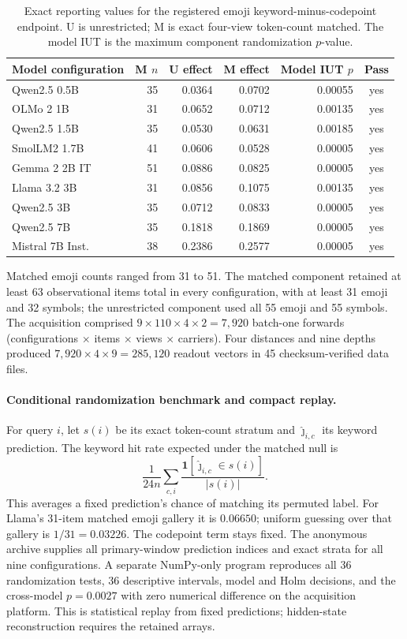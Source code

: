 \documentclass{article}
\begin{document}
\begin{table}[H]
\centering
\small
\begin{tabular}{lrrrrc}
\toprule
Model configuration & M $n$ & U effect & M effect & Model IUT $p$ & Pass \\
\midrule
Qwen2.5 0.5B & 35 & 0.0364 & 0.0702 & 0.00055 & yes \\
OLMo 2 1B & 31 & 0.0652 & 0.0712 & 0.00135 & yes \\
Qwen2.5 1.5B & 35 & 0.0530 & 0.0631 & 0.00185 & yes \\
SmolLM2 1.7B & 41 & 0.0606 & 0.0528 & 0.00005 & yes \\
Gemma 2 2B IT & 51 & 0.0886 & 0.0825 & 0.00005 & yes \\
Llama 3.2 3B & 31 & 0.0856 & 0.1075 & 0.00135 & yes \\
Qwen2.5 3B & 35 & 0.0712 & 0.0833 & 0.00005 & yes \\
Qwen2.5 7B & 35 & 0.1818 & 0.1869 & 0.00005 & yes \\
Mistral 7B Inst. & 38 & 0.2386 & 0.2577 & 0.00005 & yes \\
\bottomrule
\end{tabular}
\caption{Exact reporting values for the registered emoji
keyword-minus-codepoint endpoint. U is unrestricted; M is exact four-view
token-count matched. The model IUT is the maximum component randomization
$p$-value.}
\label{tab:observational}
\end{table}

Matched emoji counts ranged from 31 to 51. The matched component retained at
least 63 observational items total in every configuration, with at least 31 emoji and
32 symbols; the unrestricted component used all 55 emoji and 55 symbols. The
acquisition comprised $9\times110\times4\times2=7{,}920$ batch-one forwards
(configurations $\times$ items $\times$ views $\times$ carriers). Four
distances and nine depths produced $7{,}920\times4\times9=285{,}120$ readout
vectors in 45 checksum-verified data files.

\paragraph{Conditional randomization benchmark and compact replay.}
For query $i$, let $s(i)$ be its exact token-count stratum and
$\hat\jmath_{i,c}$ its keyword prediction. The keyword hit rate expected under
the matched null is
\[
 \frac{1}{24n}\sum_{c,i}
 \frac{\mathbf{1}[\hat\jmath_{i,c}\in s(i)]}{|s(i)|}.
\]
This averages a fixed prediction's chance of matching its permuted label.
For Llama's 31-item matched emoji gallery it is $0.06650$; uniform guessing
over that gallery is $1/31=0.03226$. The codepoint term stays fixed. The
anonymous archive supplies all primary-window prediction indices and exact
strata for all nine configurations. A separate NumPy-only program reproduces
all 36 randomization tests, 36 descriptive intervals, model and Holm
decisions, and the cross-model $p=0.0027$ with zero numerical difference on
the acquisition platform. This is statistical replay from fixed predictions;
hidden-state reconstruction requires the retained arrays.
\end{document}
